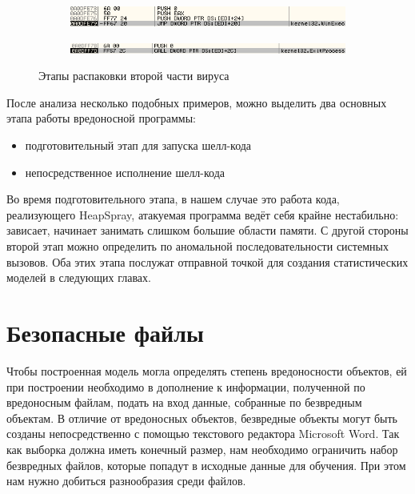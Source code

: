 \begin{figure}[ht]
\begin{subfigure}[h]{0.6\textwidth}
    \end{subfigure}        
    \begin{subfigure}[h]{0.6\textwidth}
    \centering
        \includegraphics[scale=0.7]{1.pdf/pasted-image-41.png}
        \caption{}
        
    \end{subfigure}         
    \begin{subfigure}[h]{0.6\textwidth}
    \centering
        \includegraphics[scale=0.7]{1.pdf/pasted-image-43.png}
        \caption{}
    \end{subfigure}
    \caption{Этапы распаковки второй части вируса}
    \label{fig_parsetree}
\end{figure}


После анализа несколько подобных примеров, можно выделить два основных этапа работы вредоносной программы:
\begin{itemize}
\item подготовительный этап для запуска шелл-кода
\item непосредственное исполнение шелл-кода
\end{itemize}

Во время подготовительного этапа, в нашем случае это работа кода, реализующего HeapSpray, атакуемая программа ведёт себя крайне нестабильно: зависает, начинает занимать слишком большие области памяти.
С другой стороны второй этап можно определить по аномальной последовательности системных вызовов.
Оба этих этапа послужат отправной точкой для создания статистических моделей в следующих главах.

\section{Безопасные файлы}

Чтобы построенная модель могла определять степень вредоносности объектов, ей при построении необходимо в дополнение к информации, полученной по вредоносным файлам, подать на вход данные, собранные по безвредным объектам.
В отличие от вредоносных объектов, безвредные объекты могут быть созданы непосредственно с помощью текстового редактора Microsoft Word.
Так как выборка должна иметь конечный размер, нам необходимо ограничить набор безвредных файлов, которые попадут в исходные данные для обучения.
При этом нам нужно добиться разнообразия среди файлов.

